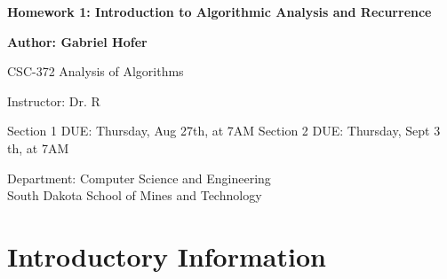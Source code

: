 \documentclass[12pt]{article}
\begin{document}
\begin{titlepage}
   \begin{center}
       \vspace*{1cm}
       \large
       \textbf{Homework 1: Introduction to Algorithmic Analysis and Recurrence}
       \normalsize

       \vspace{0.5cm}

       \textbf{Author: Gabriel Hofer}

       \vspace{0.5cm}

       CSC-372 Analysis of Algorithms

       \vspace{0.5cm}

       Instructor: Dr. R

       \vspace{0.5cm}

       Section 1 DUE: Thursday, Aug 27th, at 7AM  \newline
       Section 2 DUE: Thursday, Sept 3 th, at 7AM  

       \vfill

       Department: Computer Science and Engineering\\
       South Dakota School of Mines and Technology\\

   \end{center}
\end{titlepage}
\newpage
\section{Introductory Information}
\end{document}
